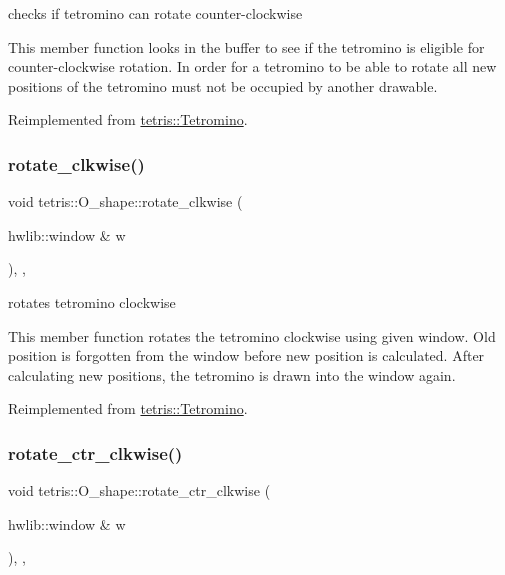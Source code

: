 checks if tetromino can rotate counter-\/clockwise 

This member function looks in the buffer to see if the tetromino is eligible for counter-\/clockwise rotation. In order for a tetromino to be able to rotate all new positions of the tetromino must not be occupied by another drawable. 

Reimplemented from \hyperlink{classtetris_1_1Tetromino_a0c0646597824b901b9b22a5b1b9d6436}{tetris\+::\+Tetromino}.

\mbox{\label{classtetris_1_1O__shape_ad7372dc4b9b832ba1fe90488b15de95f}} 
\subsubsection{\texorpdfstring{rotate\+\_\+clkwise()}{rotate\_clkwise()}}
{\footnotesize\ttfamily void tetris\+::\+O\+\_\+shape\+::rotate\+\_\+clkwise (\begin{DoxyParamCaption}\item[{hwlib\+::window \&}]{w }\end{DoxyParamCaption})\hspace{0.3cm}{\ttfamily [inline]}, {\ttfamily [override]}, {\ttfamily [virtual]}}



rotates tetromino clockwise 

This member function rotates the tetromino clockwise using given window. Old position is forgotten from the window before new position is calculated. After calculating new positions, the tetromino is drawn into the window again. 

Reimplemented from \hyperlink{classtetris_1_1Tetromino_a18a7c7e9f0caa52f425d99a818a1e2d2}{tetris\+::\+Tetromino}.

\mbox{\label{classtetris_1_1O__shape_adc8c727b5ae2ea3905ff70107be511bd}} 
\subsubsection{\texorpdfstring{rotate\+\_\+ctr\+\_\+clkwise()}{rotate\_ctr\_clkwise()}}
{\footnotesize\ttfamily void tetris\+::\+O\+\_\+shape\+::rotate\+\_\+ctr\+\_\+clkwise (\begin{DoxyParamCaption}\item[{hwlib\+::window \&}]{w }\end{DoxyParamCaption})\hspace{0.3cm}{\ttfamily [inline]}, {\ttfamily [override]}, {\ttfamily [virtual]}}



